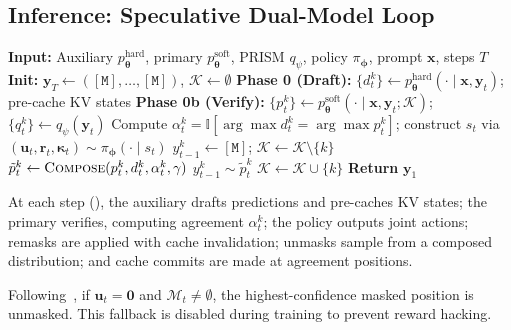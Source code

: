 \documentclass[11pt]{article}
\newcommand{\cM}{\mathcal{M}}
\newcommand{\cK}{\mathcal{K}}
\newcommand{\btheta}{\bm{\theta}}
\newcommand{\bphi}{\bm{\phi}}
\newcommand{\bx}{\mathbf{x}}
\newcommand{\by}{\mathbf{y}}
\newcommand{\bu}{\mathbf{u}}
\newcommand{\ind}{\mathbb{I}}
\newcommand{\mask}{\ensuremath{\mathtt{[M]}}}
\begin{document}
\subsection{Inference: Speculative Dual-Model Loop}
\label{sec:transition}

\begin{algorithm}[t]
\caption{AOAE Speculative Diffusion Inference}
\label{alg:aoae}
\begin{algorithmic}[1]
\State \textbf{Input:} Auxiliary $p_{\btheta}^{\text{hard}}$, primary $p_{\btheta}^{\text{soft}}$, PRISM $q_\psi$, policy $\pi_{\bphi}$, prompt $\bx$, steps $T$
\State \textbf{Init:} $\by_T \leftarrow (\mask, \dots, \mask)$, \; $\cK \leftarrow \emptyset$
    \State \textbf{Phase 0 (Draft):} $\{d_t^k\} \leftarrow p_{\btheta}^{\text{hard}}(\cdot \mid \bx, \by_t)$; pre-cache KV states 
    \State \textbf{Phase 0b (Verify):} $\{p_t^k\} \leftarrow p_{\btheta}^{\text{soft}}(\cdot \mid \bx, \by_t; \cK)$; $\{q_t^k\} \leftarrow q_\psi(\by_t)$ 
    \State Compute $\alpha_t^k = \ind[\arg\max d_t^k = \arg\max p_t^k]$; construct $s_t$ via 
    \State $(\bu_t, \mathbf{r}_t, \bm{\kappa}_t) \sim \pi_{\bphi}(\cdot \mid s_t)$
     
        \State $y_{t-1}^k \leftarrow \mask$; \; $\cK \leftarrow \cK \setminus \{k\}$
    \EndFor
    \State $\tilde{p}_t^k \leftarrow \textsc{Compose}(p_t^k, d_t^k, \alpha_t^k, \gamma)$ 
     
        \State $y_{t-1}^k \sim \tilde{p}_t^k$
    \EndFor
     
        \State $\cK \leftarrow \cK \cup \{k\}$
    \EndFor
\EndFor
\State \textbf{Return} $\by_1$
\end{algorithmic}
\end{algorithm}

At each step (), the auxiliary drafts predictions and pre-caches KV states; the primary verifies, computing agreement $\alpha_t^k$; the policy outputs joint actions; remasks are applied with cache invalidation; unmasks sample from a composed distribution; and cache commits are made at agreement positions.

Following~\cite{jazbec2025learning}, if $\bu_t = \mathbf{0}$ and $\cM_t \neq \emptyset$, the highest-confidence masked position is unmasked.
This fallback is disabled during training to prevent reward hacking.
\end{document}
